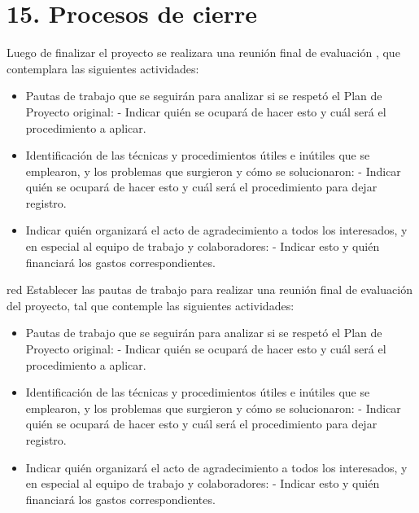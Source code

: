 \documentclass[
11pt, %
]{charter}
\begin{document}
\section{15. Procesos de cierre}    
\label{sec:cierre}



Luego de finalizar el proyecto se realizara una reunión final de evaluación , que contemplara las siguientes actividades:

\begin{itemize}
	\item Pautas de trabajo que se seguirán para analizar si se respetó el Plan de Proyecto original:
	 - Indicar quién se ocupará de hacer esto y cuál será el procedimiento a aplicar. 
	\item Identificación de las técnicas y procedimientos útiles e inútiles que se emplearon, y los problemas que surgieron y cómo se solucionaron:
	 - Indicar quién se ocupará de hacer esto y cuál será el procedimiento para dejar registro.
	\item Indicar quién organizará el acto de agradecimiento a todos los interesados, y en especial al equipo de trabajo y colaboradores:
	  - Indicar esto y quién financiará los gastos correspondientes.
\end{itemize}	  
	  
\begin{consigna}{red}
Establecer las pautas de trabajo para realizar una reunión final de evaluación del proyecto, tal que contemple las siguientes actividades:

\begin{itemize}
	\item Pautas de trabajo que se seguirán para analizar si se respetó el Plan de Proyecto original:
	 - Indicar quién se ocupará de hacer esto y cuál será el procedimiento a aplicar. 
	\item Identificación de las técnicas y procedimientos útiles e inútiles que se emplearon, y los problemas que surgieron y cómo se solucionaron:
	 - Indicar quién se ocupará de hacer esto y cuál será el procedimiento para dejar registro.
	\item Indicar quién organizará el acto de agradecimiento a todos los interesados, y en especial al equipo de trabajo y colaboradores:
	  - Indicar esto y quién financiará los gastos correspondientes.
\end{itemize}

\end{consigna}
\end{document}
